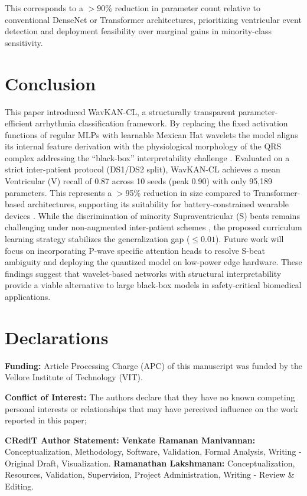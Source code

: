 \documentclass[pdflatex,sn-mathphys-num]{sn-jnl}
\theoremstyle{thmstyleone}
\theoremstyle{thmstyletwo}
\theoremstyle{thmstylethree}
\begin{document}
This corresponds to a $> 90\%$ reduction in parameter count relative to conventional DenseNet or Transformer architectures, prioritizing ventricular event detection and deployment feasibility over marginal gains in minority-class sensitivity.

\section{Conclusion}
\label{sec:conclusion}
This paper introduced WavKAN-CL, a structurally transparent parameter-efficient arrhythmia classification framework. By replacing the fixed activation functions of regular MLPs with learnable Mexican Hat wavelets the model aligns its internal feature derivation with the physiological morphology of the QRS complex addressing the ``black-box'' interpretability challenge \cite{taleban_explainable_2026}. Evaluated on a strict inter-patient protocol (DS1/DS2 split), WavKAN-CL achieves a mean Ventricular (V) recall of 0.87 across 10 seeds (peak 0.90) with only 95,189 parameters. This represents a $>$95\% reduction in size compared to Transformer-based architectures, supporting its suitability for battery-constrained wearable devices \cite{farag_tiny_2023}. While the discrimination of minority Supraventricular (S) beats remains challenging under non-augmented inter-patient schemes \cite{bahrami_investigation_2025}, the proposed curriculum learning strategy stabilizes the generalization gap ($\le 0.01$). Future work will focus on incorporating P-wave specific attention heads to resolve S-beat ambiguity and deploying the quantized model on low-power edge hardware. These findings suggest that wavelet-based networks with structural interpretability provide a viable alternative to large black-box models in safety-critical biomedical applications.

\backmatter

\section*{Declarations}

\textbf{Funding:} Article Processing Charge (APC) of this manuscript was funded by the Vellore Institute of Technology (VIT).

\textbf{Conflict of Interest:} The authors declare that they have no known competing personal interests or relationships that may have perceived influence on the work reported in this paper;

\textbf{CRediT Author Statement:} 
\textbf{Venkate Ramanan Manivannan:} Conceptualization, Methodology, Software, Validation, Formal Analysis, Writing - Original Draft, Visualization. 
\textbf{Ramanathan Lakshmanan:} Conceptualization, Resources, Validation, Supervision, Project Administration, Writing - Review \& Editing.
\end{document}
